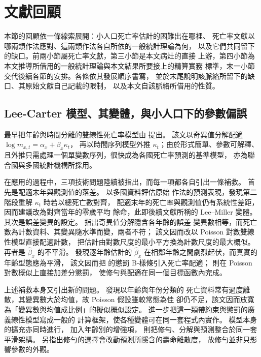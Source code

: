 \section{文獻回顧}\label{sec:lit}

本節的回顧依一條線索展開：小人口死亡率估計的困難出在哪裡、
死亡率文獻以哪兩類作法應對、這兩類作法各自所依的一般統計理論為何，
以及它們共同留下的缺口。前兩小節屬死亡率文獻，第三小節是本文病灶的直接
上游，第四小節為本文推導所借用的一般統計理論與本文結果所要接上的精算實務
標準，末一小節交代後續各節的安排。各條依其發展順序書寫，
並於末尾說明該脈絡所留下的缺口、其原始文獻自己記載的限制，
以及本文自該脈絡所借用的性質。

\subsection{Lee-Carter 模型、其變體，與小人口下的參數偏誤}\label{subsec:lc}

最早把年齡與時間分離的雙線性死亡率模型由 \citet{lee1992} 提出。
該文以奇異值分解配適 $\log m_{x,t}=\alpha_x+\beta_x\kappa_t$，
再以時間序列模型外推 $\kappa_t$；由於形式簡單、參數可解釋、
且外推只需處理一個單變數序列，很快成為各國死亡率預測的基準模型，
亦為聯合國與多國統計機構所採用。

在應用的過程中，三項技術問題陸續被指出，而每一項都各自引出一條補救。
首先是配適末年與觀測值的落差。\citet{leemiller2001} 以多國資料評估原始
作法的預測表現，發現第二階段重解 $\kappa_t$ 時若以總死亡數對齊，
配適末年的死亡率與觀測值仍有系統性差距，因而建議改為對齊當年的零歲平均
餘命，此即後續文獻所稱的 Lee--Miller 變體。
其次是誤差變異的設定。\citet{brouhns2002} 指出奇異值分解隱含各年齡的誤差
變異數相等，而死亡數為計數資料、其變異隨水準而變，兩者不符；
該文因而改以 Poisson 對數雙線性模型直接配適計數，
把估計由對數尺度的最小平方換為計數尺度的最大概似。
再者是 $\hat\beta_x$ 的不平滑。\citet{currie2004} 發現逐年齡估計的
$\hat\beta_x$ 在相鄰年齡之間劇烈起伏，而真實的年齡型態應為平滑，
該文因而把 \citet{eilers1996} 的懲罰 B-樣條引入死亡率配適；
\citet{delwarde2007} 則在 Poisson 對數概似上直接加差分懲罰，
使修勻與配適在同一個目標函數內完成。

上述補救本身又引出新的問題。\citet{djeundje2010} 發現以年齡與年份分類的
死亡資料常有過度離散，其變異數大於均值，故 Poisson 假設雖較常態為佳
卻仍不足，該文因而放寬為「變異數與均值成比例」的擬似概似設定。
\citet{currie2013} 進一步把這一類帶約束與懲罰的廣義線性模型寫成一般的
計算框架，使各種變體可在同一套程式內實作。
模型本身的擴充亦同時進行，\citet{renshaw2003} 加入年齡別的增強項，
\citet{camarda2021} 則把修勻、分解與預測整合於同一套平滑架構。
\citet{rabbi2021} 另指出修勻的選擇會改動預測所隱含的壽命離散度，
故修勻並非只影響參數的外觀。

